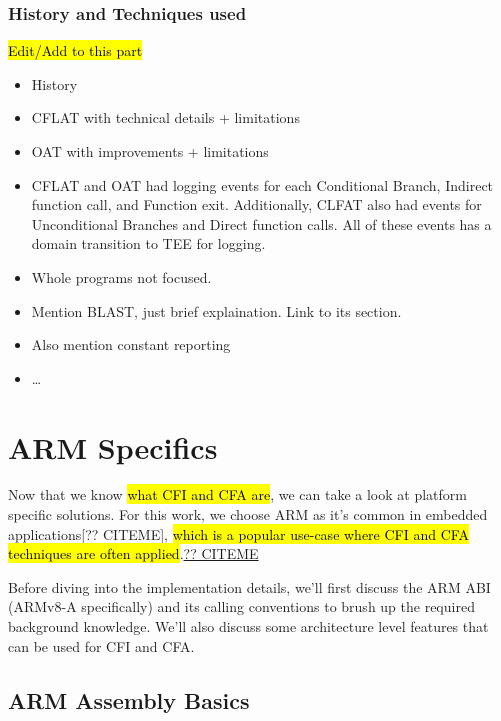 \documentclass[a4paper, nobind]{templates/ociamthesis}
\providecommand{\tightlist}{%
  \setlength{\itemsep}{0pt}\setlength{\parskip}{0pt}}
\begin{document}
\subsubsection{History and Techniques used}\label{cfahistory}

\hl{Edit/Add to this part}

\begin{itemize}
\tightlist
\item
  History
\item
  CFLAT with technical details + limitations
\item
  OAT with improvements + limitations
\item
  CFLAT and OAT had logging events for each Conditional Branch, Indirect function call, and Function exit.
  Additionally, CLFAT also had events for Unconditional Branches and Direct function calls.
  All of these events has a domain transition to TEE for logging.
\item
  Whole programs not focused.
\item
  Mention BLAST, just brief explaination. Link to its section.
\item
  Also mention constant reporting
\item
  \ldots{}
\end{itemize}

\section{ARM Specifics}\label{arm-specifics}

Now that we know \hl{what CFI and CFA are}, we can take a look at platform specific solutions.
For this work, we choose ARM as it's common in embedded applications{[}?? CITEME{]},
\hl{which is a popular use-case where CFI and CFA techniques are often applied}.\href{}{?? CITEME}

Before diving into the implementation details, we'll first discuss the ARM ABI
(ARMv8-A specifically) and its calling conventions to brush up the required background knowledge.
We'll also discuss some architecture level features that can be used for CFI and CFA.

\subsection{ARM Assembly Basics}\label{arm-assembly-basics}
\end{document}
